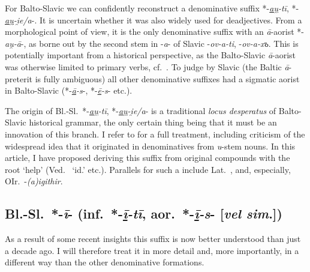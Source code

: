 \documentclass[output=paper,colorlinks,citecolor=brown]{langscibook}
\begin{document}
For Balto-Slavic we can confidently reconstruct a denominative suffix *-\textit{\underline{au̯}\nobreakdash-tī}, *-\textit{\underline{au̯}\nobreakdash-i̯e/a}-. It is uncertain whether it was also widely used for deadjectives. From a morphological point of view, it is the only denominative suffix with an \textit{ā}-aorist *-\textit{au̯-ā}-, as borne out by the second stem in -\textit{a}- of Slavic -\textit{ov-a-ti}, -\textit{ov-a-xъ}. This is potentially important from a historical perspective, as the Balto-Slavic \textit{ā}-aorist was otherwise limited to primary verbs, cf.\ \citet[382--389]{VillanuevaSvensson2020}. To judge by Slavic (the Baltic \textit{ā}-preterit is fully ambiguous) all other denominative suffixes had a sigmatic aorist in Balto-Slavic (*-\textit{\underline{ā}-s}-, *-\textit{\underline{ē}-s}- etc.).

The origin of Bl.-Sl.\ *-\textit{\underline{au̯}-tī}, *-\textit{\underline{au̯}-i̯e/a}- is a traditional \textit{locus desperatus} of Balto-Slavic historical grammar, the only certain thing being that it must be an innovation of this branch. I refer to \citet{VillanuevaSvensson2014auti} for a full treatment, including criticism of the widespread idea that it originated in denominatives from \textit{u}-stem nouns. In this article, I have proposed deriving this suffix from original compounds  with the root  ‘help’ (Ved.\  ‘id.’ etc.). Parallels for such a  include Lat.\ ,  and, especially, OIr.\ -\textit{(a)igithir}. 

\subsection{Bl.-Sl.\ *-\textit{ī}- (inf.\ *-\textit{\underline{ī}-tī}, aor.\ *-\textit{\underline{ī}-s}- [\textit{vel sim}.])}
\label{sec:BSli}

As a result of some recent insights this suffix is now better understood than just a decade ago. I will therefore treat it in more detail and, more importantly, in a different way than the other denominative formations.
\end{document}
